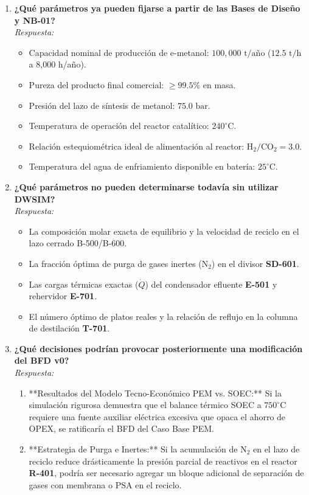 \documentclass[11pt,letterpaper]{article}
\newcommand{\tagbox}[1]{\textbf{\color{SolvantaNavy}#1}}
\begin{document}
\begin{enumerate}[label=\textbf{\arabic*.}]
    \item \textbf{¿Qué parámetros ya pueden fijarse a partir de las Bases de Diseño y NB-01?}\\[0.1cm]
    \textit{Respuesta:}
    \begin{itemize}[leftmargin=*]
        \item Capacidad nominal de producción de e-metanol: $100,000\text{ t/año}$ ($12.5\text{ t/h}$ a 8,000 h/año).
        \item Pureza del producto final comercial: $\ge 99.5\%$ en masa.
        \item Presión del lazo de síntesis de metanol: $75.0\text{ bar}$.
        \item Temperatura de operación del reactor catalítico: $240^\circ\text{C}$.
        \item Relación estequiométrica ideal de alimentación al reactor: $\text{H}_2/\text{CO}_2 = 3.0$.
        \item Temperatura del agua de enfriamiento disponible en batería: $25^\circ\text{C}$.
    \end{itemize}

    \item \textbf{¿Qué parámetros no pueden determinarse todavía sin utilizar DWSIM?}\\[0.1cm]
    \textit{Respuesta:}
    \begin{itemize}[leftmargin=*]
        \item La composición molar exacta de equilibrio y la velocidad de reciclo en el lazo cerrado B-500/B-600.
        \item La fracción óptima de purga de gases inertes ($\text{N}_2$) en el divisor \tagbox{SD-601}.
        \item Las cargas térmicas exactas ($\dot{Q}$) del condensador efluente \tagbox{E-501} y rehervidor \tagbox{E-701}.
        \item El número óptimo de platos reales y la relación de reflujo en la columna de destilación \tagbox{T-701}.
    \end{itemize}

    \item \textbf{¿Qué decisiones podrían provocar posteriormente una modificación del BFD v0?}\\[0.1cm]
    \textit{Respuesta:}
    \begin{enumerate}[label=\alph*)]
        \item **Resultados del Modelo Tecno-Económico PEM vs. SOEC:** Si la simulación rigurosa demuestra que el balance térmico SOEC a $750^\circ\text{C}$ requiere una fuente auxiliar eléctrica excesiva que opaca el ahorro de OPEX, se ratificaría el BFD del Caso Base PEM.
        \item **Estrategia de Purga e Inertes:** Si la acumulación de $\text{N}_2$ en el lazo de reciclo reduce drásticamente la presión parcial de reactivos en el reactor \tagbox{R-401}, podría ser necesario agregar un bloque adicional de separación de gases con membrana o PSA en el reciclo.
    \end{enumerate}
\end{enumerate}
\end{document}
